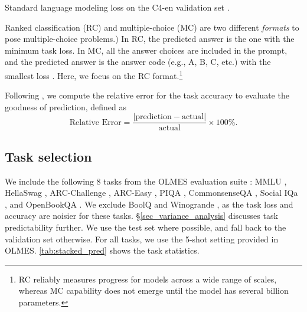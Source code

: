 Standard language modeling loss on the C4-en validation set \citep{Raffel2019ExploringTL}.


Ranked classification (RC) and multiple-choice (MC) are two different \textit{formats} to pose multiple-choice problems.)
In RC, the predicted answer is the one with the minimum task loss.
In MC, all the answer choices are included in the prompt, and the predicted answer is the answer code (e.g., A, B, C, etc.) with the smallest loss \citep{gu2024olmes}.
Here, we focus on the RC format.\footnote{RC reliably measures progress for models across a wide range of scales, whereas MC capability does not emerge until the model has several billion parameters.}

Following \citet{Gadre2024LanguageMS}, we compute the relative error for the task accuracy to evaluate the goodness of prediction, defined as
$$
\text{Relative Error} = \frac{|\text{prediction} - \text{actual}|}{\text{actual}} \times 100\%.
$$ 

\subsection{Task selection}

We include the following 8 tasks from the OLMES evaluation suite \citep{gu2024olmes}:
MMLU \citep{hendryckstest2021},
HellaSwag \citep{zellers-etal-2019-hellaswag},
ARC-Challenge \citep{Clark2018Think},
ARC-Easy \citep{Clark2018Think},
PIQA \citep{Bisk_Zellers_Le_bras_Gao_Choi_2020},
CommonsenseQA \citep{talmor-etal-2019-commonsenseqa},
Social IQa \citep{sap-etal-2019-social},
and OpenBookQA \citep{mihaylov-etal-2018-suit}.
We exclude BoolQ \citep{clark-etal-2019-boolq} and Winogrande \citep{Sakaguchi_Le_Bras_Bhagavatula_Choi_2020}, %
as the task loss and accuracy are noisier for these tasks.
\S\ref{sec_variance_analysis} discusses task predictability further.
We use the test set where possible, and fall back to the validation set otherwise.
For all tasks, we use the 5-shot setting provided in OLMES.
\autoref{tab:stacked_pred} shows the task statistics.

